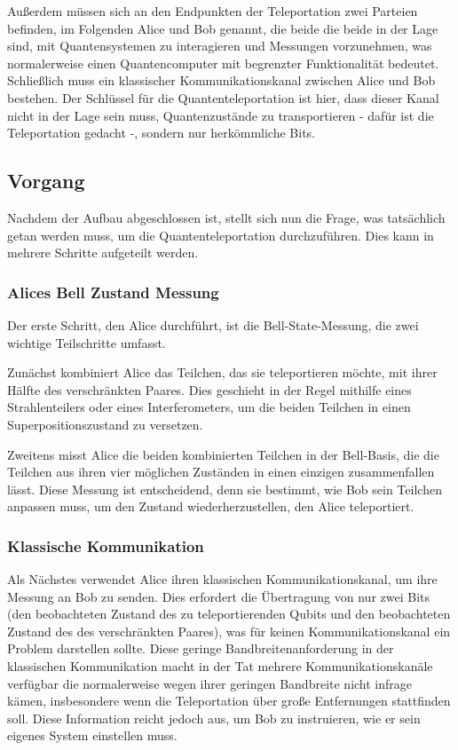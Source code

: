 Außerdem müssen sich an den Endpunkten der Teleportation zwei Parteien befinden, im Folgenden Alice und Bob genannt, die beide
die beide in der Lage sind, mit Quantensystemen zu interagieren und Messungen vorzunehmen, was normalerweise einen Quantencomputer mit begrenzter Funktionalität bedeutet.
Schließlich muss ein klassischer Kommunikationskanal zwischen Alice und Bob bestehen.
Der Schlüssel für die Quantenteleportation ist hier, dass dieser Kanal nicht in der Lage sein muss, Quantenzustände zu transportieren - dafür ist die Teleportation gedacht -, sondern nur herkömmliche Bits.


\subsection{Vorgang}\label{subsec:process}

Nachdem der Aufbau abgeschlossen ist, stellt sich nun die Frage, was tatsächlich getan werden muss, um die Quantenteleportation durchzuführen.
Dies kann in mehrere Schritte aufgeteilt werden.

\subsubsection{Alices Bell Zustand Messung}
Der erste Schritt, den Alice durchführt, ist die Bell-State-Messung, die zwei wichtige Teilschritte umfasst.

Zunächst kombiniert Alice das Teilchen, das sie teleportieren möchte, mit ihrer Hälfte des verschränkten Paares.
Dies geschieht in der Regel mithilfe eines Strahlenteilers oder eines Interferometers, um die beiden Teilchen in einen Superpositionszustand zu versetzen.

Zweitens misst Alice die beiden kombinierten Teilchen in der Bell-Basis, die die Teilchen aus ihren vier möglichen Zuständen in einen einzigen zusammenfallen lässt.
Diese Messung ist entscheidend, denn sie bestimmt, wie Bob sein Teilchen anpassen muss, um den Zustand wiederherzustellen, den
Alice teleportiert.
\subsubsection{Klassische Kommunikation}
Als Nächstes verwendet Alice ihren klassischen Kommunikationskanal, um ihre Messung an Bob zu senden.
Dies erfordert die Übertragung von nur zwei Bits (den beobachteten Zustand des zu teleportierenden Qubits und den beobachteten Zustand des
des verschränkten Paares), was für keinen Kommunikationskanal ein Problem darstellen sollte.
Diese geringe Bandbreitenanforderung in der klassischen Kommunikation macht in der Tat mehrere Kommunikationskanäle verfügbar
die normalerweise wegen ihrer geringen Bandbreite nicht infrage kämen, insbesondere wenn die Teleportation über große
Entfernungen stattfinden soll.
Diese Information reicht jedoch aus, um Bob zu instruieren, wie er sein eigenes System einstellen muss.
